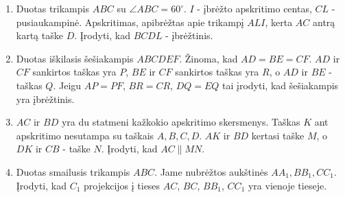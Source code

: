 \begin{enumerate}
  \item Duotas trikampis $ABC$ su $\angle ABC = 60^\circ$.
    $I$ - įbrėžto apskritimo centas, $CL$ - pusiaukampinė.
    Apskritimas, apibrėžtas apie trikampį $ALI$, kerta $AC$
    antrą kartą taške $D$. Įrodyti, kad $BCDL$ - įbrėžtinis.
  \item Duotas iškilasis šešiakampis $ABCDEF$. Žinoma, kad $AD
    = BE = CF$. $AD$ ir $CF$ sankirtos taškas yra $P$, $BE$ ir
    $CF$ sankirtos taškas yra $R$, o $AD$ ir $BE$ - taškas
    $Q$.  Jeigu $AP = PF$, $BR = CR$, $DQ = EQ$ tai įrodyti,
    kad šešiakampis yra įbrėžtinis.
  \item $AC$ ir $BD$ yra du statmeni kažkokio apskritimo
    skersmenys. Taškas $K$ ant apskritimo nesutampa su taškais
    $A, B, C, D$. $AK$ ir $BD$ kertasi taške $M$, o $DK$ ir
    $CB$ - taške $N$. Įrodyti, kad $AC\parallel{MN}$.
  \item Duotas smailusis trikampis $ABC$. Jame nubrėžtos
    aukštinės $AA_1, BB_1, CC_1$. Įrodyti, kad $C_1$
    projekcijos į tieses $AC$, $BC$, $BB_1$, $CC_1$ yra
    vienoje tieseje.

\end{enumerate}
